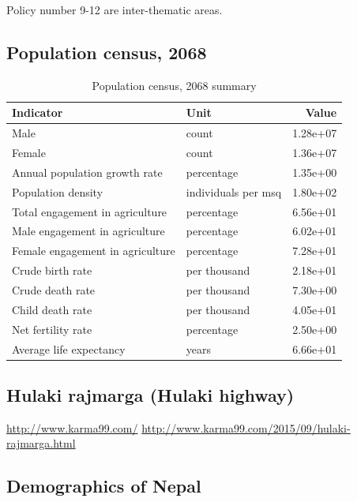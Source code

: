 \documentclass[
  openany]{book}
\begin{document}
Policy number 9-12 are inter-thematic areas.

\hypertarget{population-census-2068}{%
\subsection{Population census, 2068}\label{population-census-2068}}

\begin{longtable}[t]{llr}
\caption{\label{tab:unnamed-chunk-5}Population census, 2068 summary}\\
\toprule
Indicator & Unit & Value\\
\midrule
Male & count & 1.28e+07\\
Female & count & 1.36e+07\\
Annual population growth rate & percentage & 1.35e+00\\
Population density & individuals per msq & 1.80e+02\\
Total engagement in agriculture & percentage & 6.56e+01\\
\addlinespace
Male engagement in agriculture & percentage & 6.02e+01\\
Female engagement in agriculture & percentage & 7.28e+01\\
Crude birth rate & per thousand & 2.18e+01\\
Crude death rate & per thousand & 7.30e+00\\
Child death rate & per thousand & 4.05e+01\\
\addlinespace
Net fertility rate & percentage & 2.50e+00\\
Average life expectancy & years & 6.66e+01\\
\bottomrule
\end{longtable}

\hypertarget{hulaki-rajmarga-hulaki-highway}{%
\subsection{Hulaki rajmarga (Hulaki highway)}\label{hulaki-rajmarga-hulaki-highway}}

\url{http://www.karma99.com/}
\url{http://www.karma99.com/2015/09/hulaki-rajmarga.html}

\hypertarget{demographics-of-nepal}{%
\subsection{Demographics of Nepal}\label{demographics-of-nepal}}
\end{document}
